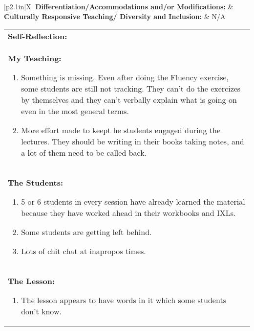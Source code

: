 \begin{small}
  \begin{tabularx}{\linewidth}{|p{2.1in}|X|}
    \hline
    \textbf{Differentiation/Accommodations and/or Modifications: } & \\
    \hline
    \textbf{Culturally Responsive Teaching/ Diversity and Inclusion: } & N/A\\
    \hline
  \end{tabularx}
  
  \vskip 6pt
  
  \begin{tabularx}{\linewidth}{|X|}
    \hline
    \textbf{Self-Reflection:} \\
    \textbf{My Teaching:} 
    \begin{enumerate}
    \item Something is missing.  Even after doing the Fluency
      exercise, some students are still not tracking.  They can't do
      the exercizes by themselves and they can't verbally explain what
      is going on even in the most general terms.
      
    \item More effort made to keept he students engaged during the
      lectures.  They should be writing in their books taking notes, and
      a lot of them need to be called back.
    \end{enumerate} \\
    
    \textbf{The Students:}
    \begin{enumerate}
      
    \item 5 or 6 students in every session have already learned the
      material because they have worked ahead in their workbooks and
      IXLs.
    \item Some students are getting left behind.
    \item Lots of chit chat at inapropos times.
    \end{enumerate} \\
    
    \textbf{The Lesson:}
    \begin{enumerate}
    \item The lesson appears to have words in it which some students
      don't know.
    \end{enumerate} \\
    
    \hline
  \end{tabularx}
\end{small}
